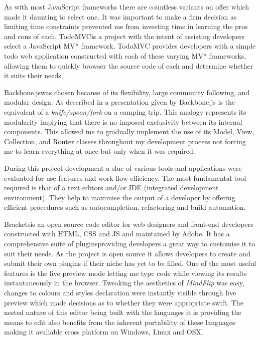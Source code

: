 \documentclass[final]{cmpreport}
\begin{document}
As with most JavaScript frameworks there are countless variants on offer which made it daunting to select one. It was important to make a firm decision as limiting time constraints prevented me from investing time in learning the pros and cons of each. TodoMVC\footnotemark is a project with the intent of assisting developers select a JavaScript MV* framework. TodoMVC provides developers with a simple todo web application constructed with each of these varying MV* frameworks, allowing them to quickly browser the source code of each and determine whether it suits their needs.


Backbone.js\footnotemark was chosen because of its flexibility, large community following, and modular design. As described in a presentation given by \citet{Bull} Backbone.js is the equivalent of a \textit{knife/spoon/fork} on a camping trip. This analogy represents its modularity implying that there is no imposed exclusivity between its internal components. This allowed me to gradually implement the use of its Model, View, Collection, and Router classes throughout my development process not forcing me to learn everything at once but only when it was required.


During this project development a slue of various tools and applications were evaluated for use features and work flow efficiency. The most fundamental tool required is that of a text editors and/or IDE (integrated development environment). They help to maximise the output of a developer by offering efficient procedures such as autocompletion, refactoring and build automation.

Brackets\footnotemark[27] is an open source code editor for web designers and front-end developers constructed with HTML, CSS and JS and maintained by Adobe. It has a comprehensive suite of plugins\footnotemark[28] providing developers a great way to customise it to suit their needs. As the project is open source it allows developers to create and submit their own plugins if their niche has yet to be filled. One of the most useful features is the live preview mode letting me type code while viewing its results instantaneously in the browser. Tweaking the aesthetics of \textit{MindFlip} was easy, changes to colours and styles declaration were instantly visible through live preview which made decisions as to whether they were appropriate swift. The nested nature of this editor being built with the languages it is providing the means to edit also benefits from the inherent portability of these languages making it avaliable cross platform on Windows, Linux and OSX.
\end{document}
